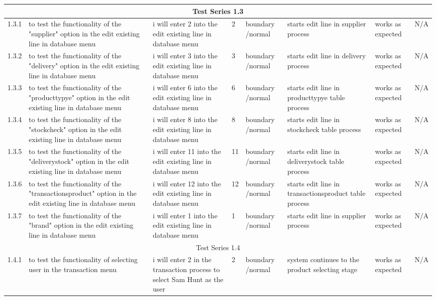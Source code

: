\begin{landscape}
\begin{center}
\begin{longtable}{|p{1.5cm}|p{2.5cm}|p{2.5cm}|p{2cm}|p{2cm}|p{2cm}|p{2cm}|p{2cm}|}
\multicolumn{8}{c}{Test Series 1.3}\\ \hline
1.3.1 & to test the functionality of the "supplier" option in the edit existing line in database menu & i will enter 2 into the edit existing line in database menu & 2 & boundary /normal & starts edit line in supplier process & works as expected & N/A \\ \hline
1.3.2 & to test the functionality of the "delivery" option in the edit existing line in database menu & i will enter 3 into the edit existing line in database menu & 3 & boundary /normal & starts edit line in delivery process & works as expected & N/A \\ \hline
1.3.3 & to test the functionality of the "producttypye" option in the edit existing line in database menu & i will enter 6 into the edit existing line in database menu & 6 & boundary /normal & starts edit line in producttypye table process & works as expected & N/A \\ \hline
1.3.4 & to test the functionality of the "stockcheck" option in the edit existing line in database menu & i will enter 8 into the edit existing line in database menu & 8 & boundary /normal & starts edit line in stockcheck table process & works as expected & N/A \\ \hline
1.3.5 & to test the functionality of the "deliverystock" option in the edit existing line in database menu & i will enter 11 into the edit existing line in database menu & 11 & boundary /normal & starts edit line in deliverystock table process & works as expected & N/A \\ \hline
1.3.6 & to test the functionality of the "transactionsproduct" option in the edit existing line in database menu & i will enter 12 into the edit existing line in database menu & 12 & boundary /normal & starts edit line in transactionsproduct table process & works as expected & N/A \\ \hline
1.3.7 & to test the functionality of the "brand" option in the edit existing line in database menu & i will enter 1 into the edit existing line in database menu & 1 & boundary /normal & starts edit line in supplier process & works as expected & N/A \\ \hline
\multicolumn{8}{c}{Test Series 1.4}\\ \hline
1.4.1 & to test the functionality of selecting user in the transaction menu & i will enter 2 in the transaction process to select Sam Hunt as the user & 2 & boundary /normal & system continues to the product selecting stage & works as expected & N/A \\ \hline

\end{longtable}
\end{center}
\end{landscape}
